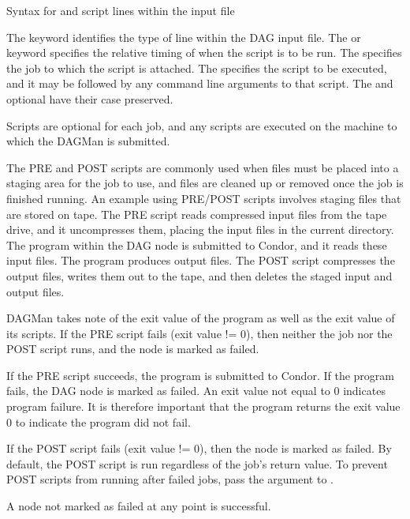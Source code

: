 Syntax for  and  script lines within the input file

    

    

The  keyword identifies the type of line within
the DAG input file.
The  or  keyword
specifies the relative timing of when the script is to be run.
The  specifies the job to which the script is attached.
The 
specifies the script to be executed, and it
may be followed by any command line arguments to that script.
The  and optional  have their
case preserved.

Scripts are optional for each job, and
any scripts are executed on the machine
to which the DAGMan is submitted.

The PRE and POST scripts are commonly used
when files must be placed into a staging area for the job to use,
and files are cleaned up or removed once the job is finished running.
An example using PRE/POST scripts involves staging files
that are stored on tape.
The PRE script reads compressed input files from the tape drive,
and it uncompresses them, placing the input files in the current directory.
The program within the DAG node is submitted to Condor,
and it reads these input files.
The program produces output files.
The POST script compresses the output files, writes them out to
the tape, and then deletes the staged input and output files.

DAGMan takes note of the exit value of the program
as well as the exit value of its scripts.
If the PRE script fails (exit value != 0), then neither the job nor
the POST script runs, and the node is marked as failed.

If the PRE script succeeds, the program is submitted to Condor. 
If the program fails, the DAG node is marked as failed.
An exit value not equal to 0 indicates program failure.
It is therefore important that the program returns the exit
value 0 to indicate the program did not fail.

If the POST script fails (exit value != 0), then the node is marked as
failed.  By default, the POST script is run regardless of the job's
return value.  To prevent POST scripts from running after failed jobs,
pass the  argument to .

A node not marked as failed at any point is successful.

